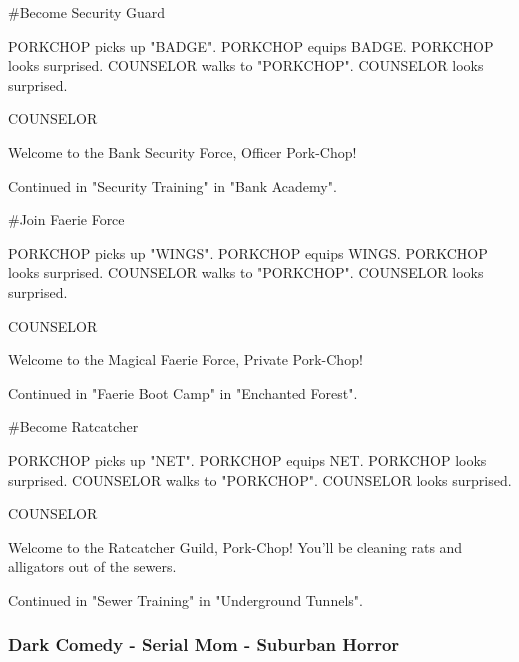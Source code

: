 \documentclass[11pt,letterpaper,oldstylefigures]{memoir}
\newcommand{\speaker}[1]{\nobreak\hspace*{0.333\textwidth}\MakeUppercase{#1}\par\nobreak\vspace{0.5\baselineskip}}
\newcommand{\dialogue}[1]{\nobreak\hspace*{0.25\textwidth}\begin{minipage}{0.5\textwidth}#1\end{minipage}\par\vspace{1\baselineskip}}
\newcommand{\stagedir}[1]{#1\par\vspace{1\baselineskip}}
\newenvironment{FountainExample}
  {\begingroup
  \ttfamily\small
   \setlength{\parindent}{0pt}
  \setlength{\parskip}{0.5em}
  \allowdisplaybreaks
  \setlength{\displaywidowpenalty}{0}
  \setlength{\widowpenalty}{0}
  \setlength{\clubpenalty}{0}
  \setlength{\interlinepenalty}{0}
}
  {\endgroup}
\begin{document}
\begin{FountainExample}
\stagedir{\#Become Security Guard}
\stagedir{PORKCHOP picks up "BADGE". PORKCHOP equips BADGE. PORKCHOP looks surprised. COUNSELOR walks to "PORKCHOP". COUNSELOR looks surprised.}

\speaker{COUNSELOR}
\dialogue{Welcome to the Bank Security Force, Officer Pork-Chop!}

\stagedir{Continued in "Security Training" in "Bank Academy".}

\stagedir{\#Join Faerie Force}
\stagedir{PORKCHOP picks up "WINGS". PORKCHOP equips WINGS. PORKCHOP looks surprised. COUNSELOR walks to "PORKCHOP". COUNSELOR looks surprised.}

\speaker{COUNSELOR}
\dialogue{Welcome to the Magical Faerie Force, Private Pork-Chop!}

\stagedir{Continued in "Faerie Boot Camp" in "Enchanted Forest".}

\stagedir{\#Become Ratcatcher}
\stagedir{PORKCHOP picks up "NET". PORKCHOP equips NET. PORKCHOP looks surprised. COUNSELOR walks to "PORKCHOP". COUNSELOR looks surprised.}

\speaker{COUNSELOR}
\dialogue{Welcome to the Ratcatcher Guild, Pork-Chop! You'll be cleaning rats and alligators out of the sewers.}

\stagedir{Continued in "Sewer Training" in "Underground Tunnels".}
\end{FountainExample}

\subsubsection*{Dark Comedy - Serial Mom - Suburban Horror}
\label{ex:dark-comedy-serial-mom-suburban-horror}
\end{document}
